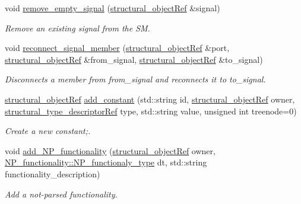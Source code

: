 \begin{DoxyCompactItemize}
\item 
void \hyperlink{classstructural__manager_a0273b1f352c2db9e096946fe5d605ae4}{remove\+\_\+empty\+\_\+signal} (\hyperlink{structural__objects_8hpp_a8ea5f8cc50ab8f4c31e2751074ff60b2}{structural\+\_\+object\+Ref} \&signal)
\begin{DoxyCompactList}\small\item\em Remove an existing signal from the SM. \end{DoxyCompactList}\item 
void \hyperlink{classstructural__manager_a587689c8dff33aaaca72b75199f683ce}{reconnect\+\_\+signal\+\_\+member} (\hyperlink{structural__objects_8hpp_a8ea5f8cc50ab8f4c31e2751074ff60b2}{structural\+\_\+object\+Ref} \&port, \hyperlink{structural__objects_8hpp_a8ea5f8cc50ab8f4c31e2751074ff60b2}{structural\+\_\+object\+Ref} \&from\+\_\+signal, \hyperlink{structural__objects_8hpp_a8ea5f8cc50ab8f4c31e2751074ff60b2}{structural\+\_\+object\+Ref} \&to\+\_\+signal)
\begin{DoxyCompactList}\small\item\em Disconnects a member from from\+\_\+signal and reconnects it to to\+\_\+signal. \end{DoxyCompactList}\item 
\hyperlink{structural__objects_8hpp_a8ea5f8cc50ab8f4c31e2751074ff60b2}{structural\+\_\+object\+Ref} \hyperlink{classstructural__manager_ae92c4d425e1e86031a2c7379d18d4443}{add\+\_\+constant} (std\+::string id, \hyperlink{structural__objects_8hpp_a8ea5f8cc50ab8f4c31e2751074ff60b2}{structural\+\_\+object\+Ref} owner, \hyperlink{structural__objects_8hpp_a219296792577e3292783725961506c83}{structural\+\_\+type\+\_\+descriptor\+Ref} type, std\+::string value, unsigned int treenode=0)
\begin{DoxyCompactList}\small\item\em Create a new constant;. \end{DoxyCompactList}\item 
void \hyperlink{classstructural__manager_a5191c94761bf9616a0f19815e2fe1057}{add\+\_\+\+N\+P\+\_\+functionality} (\hyperlink{structural__objects_8hpp_a8ea5f8cc50ab8f4c31e2751074ff60b2}{structural\+\_\+object\+Ref} owner, \hyperlink{classNP__functionality_a318d6f254060bfdf145ebeb41efe772e}{N\+P\+\_\+functionality\+::\+N\+P\+\_\+functionaly\+\_\+type} dt, std\+::string functionality\+\_\+description)
\begin{DoxyCompactList}\small\item\em Add a not-\/parsed functionality. \end{DoxyCompactList}\item 

\end{DoxyCompactItemize}
